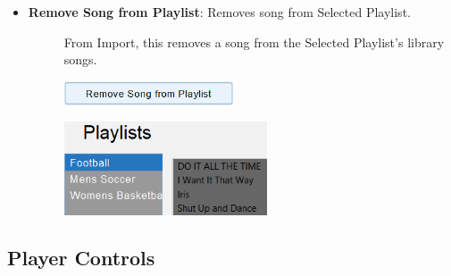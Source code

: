 \documentclass{article}
\begin{document}
\begin{itemize}
        \item \textbf{Remove Song from Playlist}: Removes song from Selected Playlist.
    \begin{description}
        \item[] From Import, this removes a song from the Selected Playlist's library songs.
        \item[] \includegraphics[width=5cm]{Images/RemoveSongFromPlaylistBtn.png}
        \item[] \includegraphics[width=6cm]{Images/RemovedSong.png}
    \end{description}
    
\end{itemize}

\subsection{Player Controls}
\end{document}
